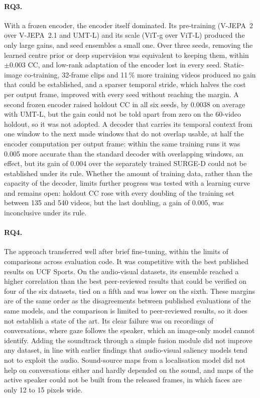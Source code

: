 \paragraph{RQ3.} With a frozen encoder, the encoder itself dominated. Its
pre-training (\acrshort{V-JEPA}~2 over \acrshort{V-JEPA}~2.1 and
\acrshort{UMT}-L) and its scale (\acrshort{ViT}-g over \acrshort{ViT}-L)
produced the only large gains, and seed ensembles a small one. Over three
seeds, removing the learned centre prior or deep supervision was equivalent to
keeping them, within $\pm0.003$ \acrshort{CC}, and low-rank adaptation of the encoder lost
in every seed. Static-image co-training, 32-frame clips and 11\,\% more training
videos produced no gain that could be established, and a sparser temporal
stride, which halves the cost per output frame, improved with every seed
without reaching the margin. A second frozen encoder raised holdout \acrshort{CC}
in all six seeds, by 0.0038 on average with \acrshort{UMT}-L, but the gain
could not be told apart from zero on the 60-video holdout, so it was not
adopted. A decoder that carries its temporal context from one window to the
next made windows that do not overlap usable, at half the encoder computation
per output frame: within the same training runs it was 0.005 more accurate than
the standard decoder with overlapping windows, an effect, but its gain of 0.004
over the separately trained SURGE-D could not be established under its rule.
Whether the amount of training data, rather than
the capacity of the decoder, limits further progress was tested with a learning
curve and remains open: holdout \acrshort{CC} rose with every doubling of the
training set between 135 and 540 videos, but the last doubling, a gain of
0.005, was inconclusive under its rule.

\paragraph{RQ4.} The approach transferred well after brief fine-tuning, within
the limits of comparisons across evaluation code. It was competitive with the
best published results on UCF Sports. On the audio-visual datasets, its ensemble
reached a higher correlation than the best peer-reviewed results that could be
verified on four of the six datasets, tied on a fifth and was lower on the
sixth. These margins are of the same order as the disagreements between
published evaluations of the same models, and the comparison is limited to
peer-reviewed results, so it does not establish a state of the art. Its clear
failure was on recordings of
conversations, where gaze follows the speaker, which an image-only model cannot
identify. Adding the soundtrack through a simple fusion module did not improve
any dataset, in line with earlier findings that audio-visual saliency models
tend not to exploit the audio. Sound-source maps from a localisation model did
not help on conversations either and hardly depended on the sound, and maps of
the active speaker could not be built from the released frames, in which faces
are only 12 to 15 pixels wide.

